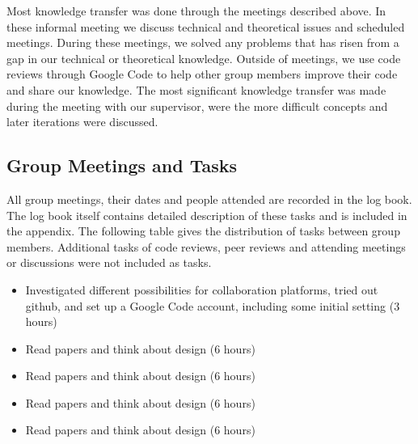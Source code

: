Most knowledge transfer was done through the meetings described above. In these informal meeting we discuss technical and theoretical issues
and scheduled meetings. During these meetings, we solved any problems that has risen
from a gap in our technical or theoretical knowledge. Outside of meetings, we use code
reviews through Google Code to help other group members improve their code and share
our knowledge. The most significant knowledge transfer was made during the meeting with our supervisor, were the more difficult concepts and later iterations were discussed.

\subsection*{Group Meetings and Tasks}

All group meetings, their dates and people attended are recorded in the log book. The log book itself contains detailed description of these tasks and is included in the appendix. The following table gives the distribution of tasks between group members. Additional tasks of code reviews, peer reviews and attending meetings or discussions were not included as tasks.

%
{ \begin{itemize} 
    \item Investigated different possibilities for collaboration platforms,
tried out github, and set up a Google Code account, including some
initial setting (3 hours)
    \item Read papers and think about design (6 hours)
 \end{itemize} 
}%
{ \begin{itemize} 
    \item Read papers and think about design (6 hours)
 \end{itemize} 
}%
{ \begin{itemize} 
    \item Read papers and think about design (6 hours)
 \end{itemize} 
}%
{ \begin{itemize} 
    \item Read papers and think about design (6 hours)
 \end{itemize} 
}%

